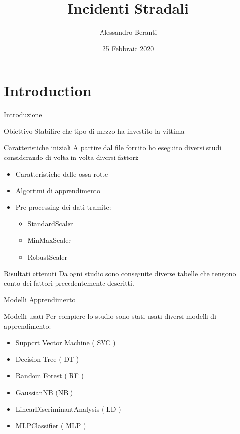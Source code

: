 \documentclass{beamer}
\title[Your Short Title]{Incidenti Stradali}
\author{Alessandro Beranti}
\institute{Università degli Studi di Milano Statale }
\date{25 Febbraio 2020}
\begin{document}
\begin{frame}
  \titlepage
\end{frame}

\section{Introduction}

\begin{frame}{Introduzione}

\begin{block}{Obiettivo}
	Stabilire che tipo di mezzo ha investito la vittima
\end{block}

\begin{block}{Caratteristiche iniziali}
A partire dal file fornito ho eseguito diversi studi considerando di volta in volta diversi fattori:
\end{block}

\begin{itemize}
	\item Caratteristiche delle ossa rotte
	\item Algoritmi di apprendimento
	\item Pre-processing dei dati tramite: 
	\begin{itemize}
		\item StandardScaler
		\item MinMaxScaler
		\item RobustScaler
	\end{itemize}
\end{itemize}


\begin{block}{Risultati ottenuti}
Da ogni studio sono conseguite diverse tabelle che tengono conto dei fattori precedentemente descritti.
\end{block}

\end{frame}

\begin{frame}{Modelli Apprendimento}
\begin{block}{Modelli usati}
	Per compiere lo studio sono stati usati diversi modelli di apprendimento:
	\begin{itemize}
		\item Support Vector Machine ( SVC )
		\item Decision Tree ( DT )
		\item Random Forest ( RF )
		\item GaussianNB (NB )
		\item LinearDiscriminantAnalysis ( LD )
		\item MLPClassifier ( MLP )
	\end{itemize}
\end{block}

\end{frame}
\end{document}
